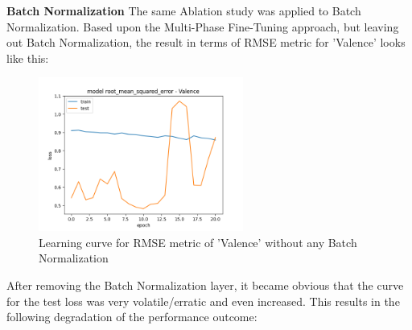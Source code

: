 \textbf{Batch Normalization}\newline
The same Ablation study was applied to Batch Normalization. Based upon the Multi-Phase Fine-Tuning approach, but leaving out Batch Normalization, the result in terms of RMSE metric for 'Valence' looks like this:

\begin{figure}[H]
  \begin{center}
  \includegraphics[angle=0, width=0.6\textwidth]{Figures/rmse_out1_noBatchNorm.png}
  \caption{Learning curve for RMSE metric of 'Valence' without any Batch Normalization}
  \label{fig:AblationNoBatchNorm}
  \end{center}
\end{figure}         

After removing the Batch Normalization layer, it became obvious that the curve for the test loss was very volatile/erratic and even increased. This results in the following degradation of the performance outcome:

